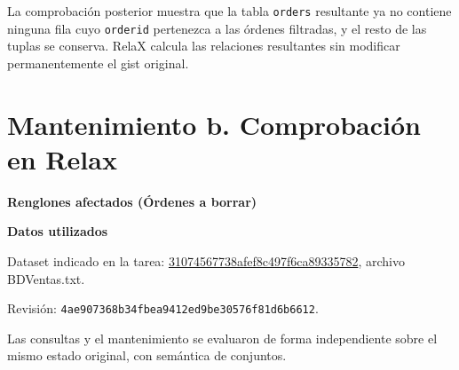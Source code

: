 La comprobación posterior muestra que la tabla \texttt{orders} resultante ya no contiene ninguna fila cuyo \texttt{orderid} pertenezca a las órdenes filtradas, y el resto de las tuplas se conserva. RelaX calcula las relaciones resultantes sin modificar permanentemente el gist original.

\newpage
\section*{Mantenimiento b. Comprobación en Relax}
\textbf{Renglones afectados (Órdenes a borrar)}


\textbf{Datos utilizados}\par
Dataset indicado en la tarea: \href{https://gist.github.com/cyrus96/31074567738afef8c497f6ca89335782}{31074567738afef8c497f6ca89335782}, archivo BDVentas.txt.\par 
Revisión: \texttt{4ae907368b34fbea9412ed9be30576f81d6b6612}.\par
Las consultas y el mantenimiento se evaluaron de forma independiente sobre el mismo estado original, con semántica de conjuntos.